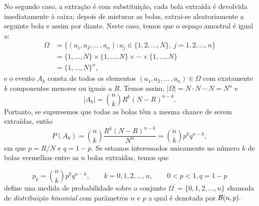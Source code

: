 \begin{frame}
\begin{block}{}
 No segundo caso, a extração é com substituição, cada bola extraída  é devolvida imediatamente à caixa; depois de misturar as bolas, extrai-se aleatoriamente a seguinte bola e  assim por diante. Neste caso, temos que o espaço amostral é igual a: 
$$
\begin{aligned}
\Omega &= \{(a_1, a_2, \ldots \, , a_n) : a_j \in \{1,2, \dots , N\},\ j= 1,2, \dots , n\}\\
&=\{1,\dots , N\}\times \{1, \dots , N\}\times \cdots \times\{1, \dots , N\} \\ 
&=\{1, \dots , N\}^n,  
\end{aligned}
$$
e o evento $A_k$ consta de todos os elementos $ (a_1, a_2, \ldots \, , a_n) \in \Omega$ com exatamente 
$k$ componentes menores ou iguais a $R$. Temos assim, $ \left| \Omega \right| =  N\cdot N \, \cdots \, N=N^n$ e $$\left|A_k \right|=\binom{n}{k}R^k(N-R)^{n-k}. $$ Portanto, se supursemos que todas as bolas têm a mesma chance de serem extraídas, então 
$$P(A_k)=\binom{n}{k}\frac{R^k(N-R)^{n-k}}{N^n}=\binom{n}{k}p^k q^{n-k},$$ em que $p=R/N$ e $q=1-p.$ 
Se estamos interessados unicamente no número $k$ de bolas vermelhas entre as $n$ bolas extraídas,  temos que

$$p_k= \binom{n}{k}p^k q^{n-k}, \qquad k=0,1,2,\dots , n, \qquad 0<p<1, q=1-p$$ define una medida de probabilidade sobre o conjunto 
$\Omega^\prime =\{0,1,2, \dots ,n\}$  chamada de  \textit{distribuição binomial} com parâmetros $n$ e $p$ a qual é denotada por ${\cal B}(n,p).$ 
\end{block}
\end{frame}


